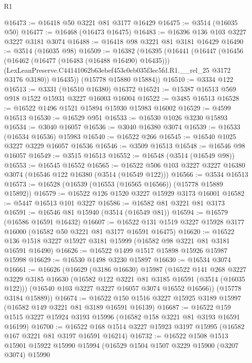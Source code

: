 \begin{lexlean}{R1}
\begin{coremodule}
@16473 := @16418 @50 @3221 @81 @3177 @16429
@16475 := @3514 (@16035 @50)
@16477 := @16468 (@16473 @16475)
@16483 := @16396 @136 @103 @3227 @3227 @3181 @3074
@16488 := @16418 @98 @3221 @81 @3181 @16429
@16490 := @3514 (@16035 @98)
@16509 := @16382
    (@16395
      (@16441
        (@16447
          (@16456
            (@16462 (@16477 (@16483 (@16488 @16490) @16435)))
            (LexLeanPreserve.C44141062b63ebef453c0eb035f3ec5fd.R1.__rel_25 @3172 @3176 @3180))
          @16435))
      (@15778 @15880 @15884))
@16510 := @3334 @122
@16513 := @3331 (@16510 @16380) @16372
@16521 := @15387 @16513 @569 @918 @1522 @15931 @3227 @16003 @16004
@16522 := @3485 @16513
@16528 := @16522 @1496 @1521 @15894 @15930 @15983 @16002
@16529 := @4599 @16513
@16530 := @16529 @951
@16533 := @16530 @1026 @3230 @15893
@16534 := @3040 @16057
@16536 := @3040 @16380 @3074
@16539 := @16533 (@16534 @16536) @15983
@16540 := @16522 @266
@16545 := @16540 @1025 @3227 @3229 @16057 @16536
@16546 := @3509 @16513
@16548 := @16546 @98 @16057
@16549 := @3515 @16513
@16552 := @16548 (@3514 (@16549 @98))
@16553 := @16545 @16552
@16565 := @16522 @506 @103 @3227 @3227 @16380 @3074 (@16546 @122 @16380 (@3514 (@16549 @122)))
@16566 := @3534 @16513
@16573 := @16528 (@16539 (@16553 (@16565 @16566)) (@15778 @15889 @15892))
@16579 := @16522 @126 @1520 @3227 @15929 @3173 @16001
@16582 := @5447 @16513 @101 @3227
@16586 := @16582 @81 @3221 @81 @3173
@16591 := @16546 @81 @15940 (@3514 (@16549 @81))
@16594 := @16579 (@16586 @16591 @16432)
@16607 := @16522 @131 @1519 @3227 @15928 @3177 @16000 (@16582 @50 @3221 @81 @3177 @16591 @16475)
@16620 := @16522 @136 @1518 @3227 @15927 @3181 @15999 (@16582 @98 @3221 @81 @3181 @16591 @16490)
@16626 := @16522 @1499 @1517 @15898 @15926 @15987 @15998
@16629 := @16530 @1498 @3230 @15897
@16630 := @16534 @3074
@16661 := @16626
    (@16629
      (@3186 @16630)
      @15987
      (@16522
        @141
        @268
        @3227
        @3229
        @3185
        @16630
        (@16582 @122 @3221 @81 @3185 @16591 (@3514 (@16035 @122)))
        (@16540 @103 @3227 @3227 @16057 @3074 @16552 @16566))
      (@15778 @3184 @15889))
@16674 := @16522 @150 @1516 @3227 @15925 @3189 @15997 (@16582 @149 @3221 @81 @3189 @16591 @16139)
@16687 := @16522 @159 @1515 @3227 @15924 @3193 @15996 (@16582 @158 @3221 @81 @3193 @16591 @16199)
@16700 := @16522 @168 @1514 @3227 @15923 @3197 @15995 (@16582 @167 @3221 @81 @3197 @16591 @16214)
@16732 := @16522
    @1508
    @1513
    @15901
    @15922
    @15990
    @15994
    (@16529
      @1504
      @1507
      @3229
      @15900
      (@3207 @3074)
      @15990

\end{coremodule}
\end{lexlean}
